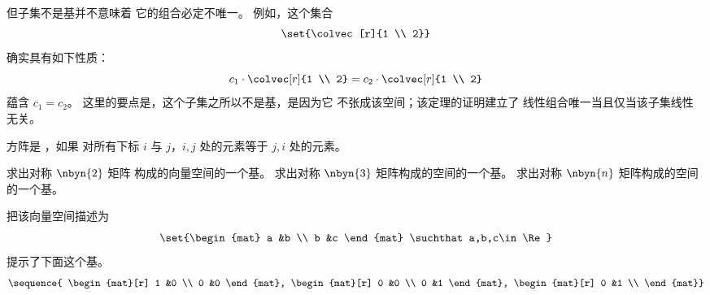 \begin{exercises}
\begin{answer}
      但子集不是基并不意味着
      它的组合必定不唯一。
      例如，这个集合
      \begin{equation*}
        \set{\colvec[r]{1 \\ 2}}
      \end{equation*}
      确实具有如下性质：
      \begin{equation*}
        c_1\cdot\colvec[r]{1 \\ 2}
        =
        c_2\cdot\colvec[r]{1 \\ 2}
      \end{equation*}
      蕴含 $c_1=c_2$。
      这里的要点是，这个子集之所以不是基，是因为它
      不张成该空间；该定理的证明建立了
      线性组合唯一当且仅当该子集线性
      无关。
     \end{answer}
  \item
    方阵是%
    ，如果
    对所有下标 \( i \) 与
    \( j \)，\( i,j \) 处的元素等于 \( j,i \) 处的元素。
    \begin{exparts}
      \partsitem 求出对称 \( \nbyn{2} \) 矩阵
        构成的向量空间的一个基。
      \partsitem 求出对称 \( \nbyn{3} \)
        矩阵构成的空间的一个基。
      \partsitem 求出对称 \( \nbyn{n} \)
        矩阵构成的空间的一个基。
    \end{exparts}
    \begin{answer}
      \begin{exparts}
        \partsitem 把该向量空间描述为
          \begin{equation*}
             \set{\begin{mat}
                     a  &b  \\
                     b  &c
                  \end{mat}  \suchthat a,b,c\in\Re}
          \end{equation*}
          提示了下面这个基。
          \begin{equation*}
            \sequence{
              \begin{mat}[r]
                1  &0  \\
                0  &0
              \end{mat},
              \begin{mat}[r]
                0  &0  \\
                0  &1
              \end{mat},
              \begin{mat}[r]
                0  &1  \\

\end{mat}}
\end{equation*}
\end{exparts}
\end{answer}
\end{exercises}
